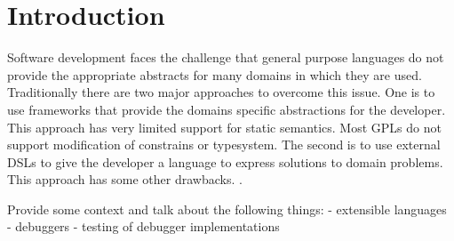 \section{Introduction}
Software development faces the challenge that general purpose languages do not provide the appropriate abstracts for many domains in which they are used. Traditionally there are two major approaches to overcome this issue. One is to use frameworks that provide the domains specific abstractions for the developer. This approach has very limited support for static semantics. Most \acp{GPL} do not support modification of constrains or typesystem. The second is to use external \acp{DSL} to give the developer a language to express solutions to domain problems. This approach has some other drawbacks. .
 

Provide some context and talk about the following things:
- extensible languages
- debuggers 
- testing of debugger implementations
